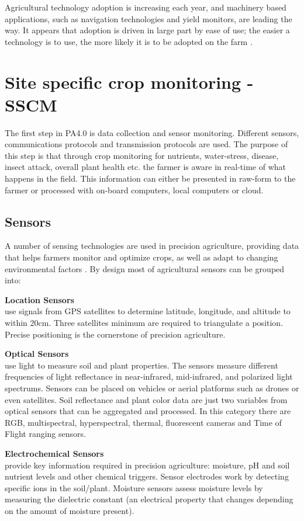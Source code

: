 \documentclass[review]{elsarticle}
\begin{document}
    Agricultural technology adoption is increasing each year, and machinery based applications, such as navigation technologies and yield monitors, are leading the way. It appears that adoption is driven in large part by ease of use; the easier a technology is to use, the more likely it is to be adopted on the farm \cite{Pierpaoli_2013}.

\section{Site specific crop monitoring - SSCM}
    The first step in PA4.0 is data collection and sensor monitoring. Different sensors, communications protocols and transmission protocols are used. The purpose of this step is that through crop monitoring for nutrients, water-stress, disease, insect attack, overall plant health etc. the farmer is aware in real-time of what happens in the field. This information can either be presented in raw-form to the farmer or processed with on-board computers, local computers or cloud.

\subsection{Sensors}
    A number of sensing technologies are used in precision agriculture, providing data that helps farmers monitor and optimize crops, as well as adapt to changing environmental factors \cite{Zude_Sasse_2016}. By design most of agricultural sensors can be grouped into:

    \textbf{Location Sensors} \\use signals from GPS satellites to determine latitude, longitude, and altitude to within 20cm. Three satellites minimum are required to triangulate a position. Precise positioning is the cornerstone of precision agriculture.

    \textbf{Optical Sensors} \\use light to measure soil and plant properties. The sensors measure different frequencies of light reflectance in near-infrared, mid-infrared, and polarized light spectrums. Sensors can be placed on vehicles or aerial platforms such as drones or even satellites. Soil reflectance and plant color data are just two variables from optical sensors that can be aggregated and processed. In this category there are RGB, multispectral, hyperspectral, thermal, fluorescent cameras and Time of Flight ranging sensors. 

    \textbf{Electrochemical Sensors} \\provide key information required in precision agriculture: moisture, pH and soil nutrient levels and other chemical triggers. Sensor electrodes work by detecting specific ions in the soil/plant. Moisture sensors assess moisture levels by measuring the dielectric constant (an electrical property that changes depending on the amount of moisture present).
\end{document}
